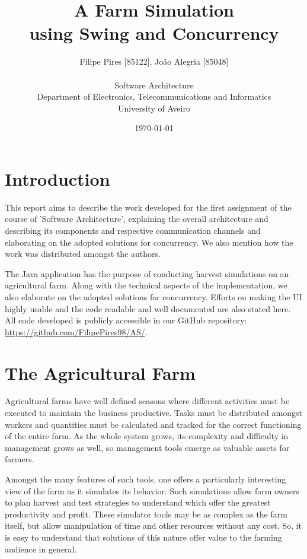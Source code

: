 \documentclass[12pt]{article}
\title{A Farm Simulation\\using Swing and Concurrency}
\author
{Filipe Pires [85122], João Alegria [85048]\\
\\
Software Architecture\\
\normalsize{Department of Electronics, Telecommunications and Informatics}\\
\normalsize{University of Aveiro}\\
}
\date{\today{}}
\begin{document}
 

\baselineskip18pt

\maketitle 

\section{Introduction} %

This report aims to describe the work developed for the first assignment of the course of 'Software Architecture', explaining the overall architecture and 
describing its components and respective communication channels and elaborating on the adopted solutions for concurrency.
We also mention how the work was distributed amongst the authors.

The Java application has the purpose of conducting harvest simulations on an agricultural farm.
Along with the technical aspects of the implementation, we also elaborate on the adopted solutions for concurrency.
Efforts on making the UI highly usable and the code readable and well documented are also stated here.
All code developed is publicly accessible in our GitHub repository: 
\url{https://github.com/FilipePires98/AS/}.
\newpage

\section{The Agricultural Farm} \label{farm} %

Agricultural farms have well defined seasons where different activities must be executed to maintain the business productive.
Tasks must be distributed amongst workers and quantities must be calculated and tracked for the correct functioning of the entire farm.
As the whole system grows, its complexity and difficulty in management grows as well, so management tools emerge as valuable assets for farmers.

Amongst the many features of such tools, one offers a particularly interesting view of the farm as it simulates its behavior.
Such simulations allow farm owners to plan harvest and test strategies to understand which offer the greatest productivity and profit.
These simulator tools may be as complex as the farm itself, but allow manipulation of time and other resources without any cost.
So, it is easy to understand that solutions of this nature offer value to the farming audience in general.
\end{document}
